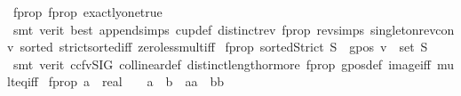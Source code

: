 \begin{isabellebody}
\endisadelimproof
%
\isatagproof
{}\isamarkupfalse%
\ f{\isacharunderscore}{\kern0pt}prop{}\ f{\isacharunderscore}{\kern0pt}prop{}\ exactly{\isacharunderscore}{\kern0pt}one{\isacharunderscore}{\kern0pt}true\isanewline
\ \ \isamarkupfalse%
\ {\isacharparenleft}{\kern0pt}smt\ {\isacharparenleft}{\kern0pt}verit{\isacharcomma}{\kern0pt}\ best{\isacharparenright}{\kern0pt}\ append{\isachardot}{\kern0pt}simps{\isacharparenleft}{\kern0pt}{}{\isacharcomma}{\kern0pt}{}{\isacharparenright}{\kern0pt}\ cup{}{\isacharunderscore}{\kern0pt}def\ distinct{\isacharunderscore}{\kern0pt}rev\ f{\isacharunderscore}{\kern0pt}prop{}\ rev{\isachardot}{\kern0pt}simps{\isacharparenleft}{\kern0pt}{}{\isacharparenright}{\kern0pt}\ singleton{\isacharunderscore}{\kern0pt}rev{\isacharunderscore}{\kern0pt}conv\ sorted{}\ strict{\isacharunderscore}{\kern0pt}sorted{\isacharunderscore}{\kern0pt}iff\ zero{\isacharunderscore}{\kern0pt}less{\isacharunderscore}{\kern0pt}mult{\isacharunderscore}{\kern0pt}iff{\isacharparenright}{\kern0pt}%
\endisatagproof
{\isafoldproof}%
%
\isadelimproof
\isanewline
%
\endisadelimproof
{}\isamarkupfalse%
\ f{\isacharunderscore}{\kern0pt}prop{}{\isacharcolon}{\kern0pt}\ {\isachardoublequoteopen}sortedStrict\ S\ {\isasymlongrightarrow}\ gpos\ {\isacharparenleft}{\kern0pt}v{}\ {\isacharbackquote}{\kern0pt}\ set\ S{\isacharparenright}{\kern0pt}{\isachardoublequoteclose}\isanewline
%
\isadelimproof
\ \ %
\endisadelimproof
%
\isatagproof
{}\isamarkupfalse%
\ {\isacharparenleft}{\kern0pt}smt\ {\isacharparenleft}{\kern0pt}verit{\isacharcomma}{\kern0pt}\ ccfv{\isacharunderscore}{\kern0pt}SIG{\isacharparenright}{\kern0pt}\ collinear{}{\isacharunderscore}{\kern0pt}def\ distinct{\isacharunderscore}{\kern0pt}length{\isacharunderscore}{\kern0pt}{}{\isacharunderscore}{\kern0pt}or{\isacharunderscore}{\kern0pt}more\ f{\isacharunderscore}{\kern0pt}prop{}\ gpos{\isacharunderscore}{\kern0pt}def\ image{\isacharunderscore}{\kern0pt}iff\ mult{\isacharunderscore}{\kern0pt}eq{\isacharunderscore}{\kern0pt}{}{\isacharunderscore}{\kern0pt}iff{\isacharparenright}{\kern0pt}%
\endisatagproof
{\isafoldproof}%
%
\isadelimproof
\isanewline
%
\endisadelimproof
{}\isamarkupfalse%
\ f{\isacharunderscore}{\kern0pt}prop{}{\isacharcolon}{\kern0pt}\ {\isachardoublequoteopen}{\isacharparenleft}{\kern0pt}a\ {\isacharcolon}{\kern0pt}{\isacharcolon}{\kern0pt}\ real{\isacharparenright}{\kern0pt}\ {\isachargreater}{\kern0pt}\ {}\ {\isasymlongrightarrow}\ {\isacharparenleft}{\kern0pt}{\isacharparenleft}{\kern0pt}a\ {\isacharless}{\kern0pt}\ b{\isacharparenright}{\kern0pt}\ {\isasymlongrightarrow}\ {\isacharparenleft}{\kern0pt}a{\isacharasterisk}{\kern0pt}a\ {\isacharless}{\kern0pt}\ b{\isacharasterisk}{\kern0pt}b{\isacharparenright}{\kern0pt}{\isacharparenright}{\kern0pt}{\isachardoublequoteclose}%

\end{isabellebody}
